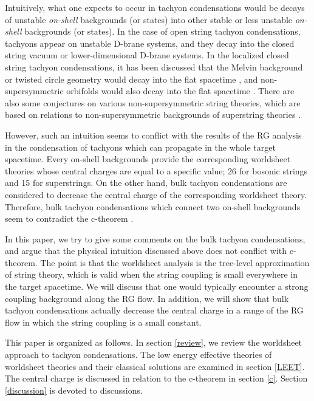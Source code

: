 \documentclass[a4paper,a4paper]{article}
\begin{document}
Intuitively, what one expects to occur in tachyon condensations would be decays of unstable {\it on-shell} 
backgrounds (or states) into other stable or less unstable {\it on-shell} backgrounds (or states). 
In the case of open string tachyon condensations, tachyons appear on unstable D-brane systems, and they decay 
into the closed string vacuum or lower-dimensional D-brane systems. 
In the localized closed string tachyon condensations, it has been discussed that the Melvin background or twisted 
circle geometry would decay into the flat spacetime \cite{Melvin}\cite{Melvin2}, 
and non-supersymmetric orbifolds would also decay into the 
flat spacetime \cite{APS}\cite{Vafa}\cite{HKMM}.  
There are also some conjectures on various non-supersymmetric string theories, which are based on relations to 
non-supersymmetric backgrounds of superstring theories \cite{TypeII}\cite{hetero}. 

However, such an intuition seems to conflict with the results of the RG analysis in the condensation of tachyons 
which can propagate in the whole target spacetime. 
Every on-shell backgrounds provide the corresponding worldsheet theories whose central charges are 
equal to a specific  
value; 26 for bosonic strings and 15 for superstrings. 
On the other hand, bulk tachyon condensations are considered to decrease the central charge of the corresponding 
worldsheet theory. 
Therefore, bulk tachyon condensations which connect two on-shell backgrounds seem to contradict the c-theorem 
\cite{c-th}. 

In this paper, we try to give some comments on the bulk tachyon condensations, and argue that the physical 
intuition discussed above does not conflict with c-theorem. 
The point is that the worldsheet analysis is the tree-level approximation of string theory, which is 
valid when the string coupling is small everywhere in the target spacetime. 
We will discuss that one would typically encounter a strong coupling background along the RG flow. 
In addition, we will show that bulk tachyon condensations actually decrease the central charge in a range of the 
RG flow in which the string coupling is a small constant. 

This paper is organized as follows. 
In section \ref{review}, we review the worldsheet approach to tachyon condensations. 
The low energy effective theories of worldsheet theories and their classical solutions are examined in section 
\ref{LEET}. 
The central charge is discussed in relation to the c-theorem in section \ref{c}. 
Section \ref{discussion} is devoted to discussions. 
\end{document}
